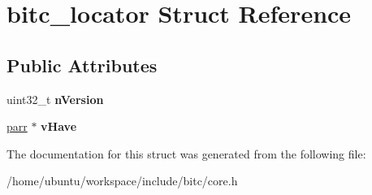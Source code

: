 \hypertarget{structbitc__locator}{\section{bitc\-\_\-locator Struct Reference}
\label{structbitc__locator}
}
\subsection*{Public Attributes}
\begin{DoxyCompactItemize}
\item 
\hypertarget{structbitc__locator_a835aff1fc27696589b36ee837c40c6c0}{uint32\-\_\-t {\bfseries n\-Version}}\label{structbitc__locator_a835aff1fc27696589b36ee837c40c6c0}

\item 
\hypertarget{structbitc__locator_a9adc3a3f0b7926ec80a775c8451b10da}{\hyperlink{structparr}{parr} $\ast$ {\bfseries v\-Have}}\label{structbitc__locator_a9adc3a3f0b7926ec80a775c8451b10da}

\end{DoxyCompactItemize}


The documentation for this struct was generated from the following file\-:\begin{DoxyCompactItemize}
\item 
/home/ubuntu/workspace/include/bitc/core.\-h\end{DoxyCompactItemize}
